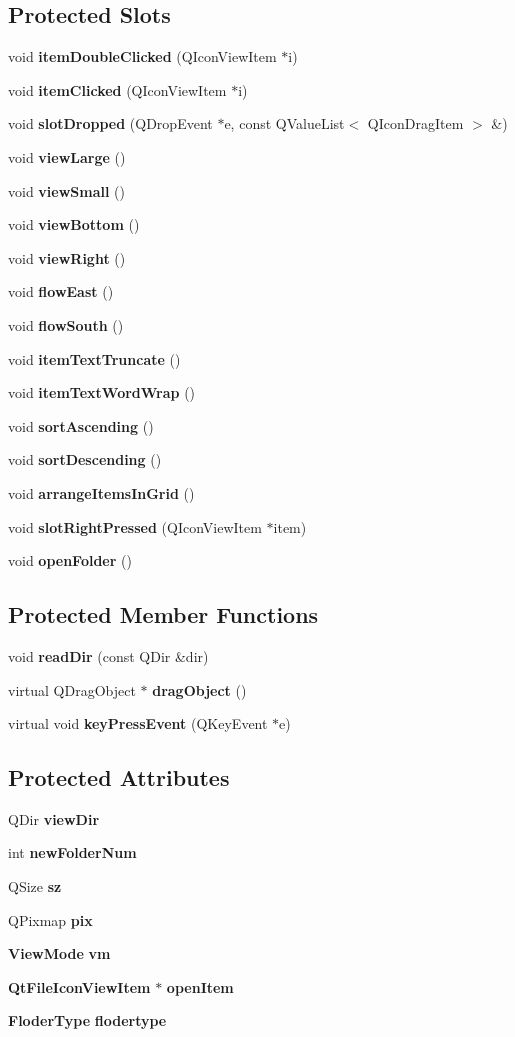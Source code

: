 \subsection*{Protected Slots}
\begin{CompactItemize}
\item 
void {\bf item\-Double\-Clicked} (QIcon\-View\-Item $\ast$i)
\item 
void {\bf item\-Clicked} (QIcon\-View\-Item $\ast$i)
\item 
void {\bf slot\-Dropped} (QDrop\-Event $\ast$e, const QValue\-List$<$ QIcon\-Drag\-Item $>$ \&)
\item 
void {\bf view\-Large} ()
\item 
void {\bf view\-Small} ()
\item 
void {\bf view\-Bottom} ()
\item 
void {\bf view\-Right} ()
\item 
void {\bf flow\-East} ()
\item 
void {\bf flow\-South} ()
\item 
void {\bf item\-Text\-Truncate} ()
\item 
void {\bf item\-Text\-Word\-Wrap} ()
\item 
void {\bf sort\-Ascending} ()
\item 
void {\bf sort\-Descending} ()
\item 
void {\bf arrange\-Items\-In\-Grid} ()
\item 
void {\bf slot\-Right\-Pressed} (QIcon\-View\-Item $\ast$item)
\item 
void {\bf open\-Folder} ()
\end{CompactItemize}
\subsection*{Protected Member Functions}
\begin{CompactItemize}
\item 
void {\bf read\-Dir} (const QDir \&dir)
\item 
virtual QDrag\-Object $\ast$ {\bf drag\-Object} ()
\item 
virtual void {\bf key\-Press\-Event} (QKey\-Event $\ast$e)
\end{CompactItemize}
\subsection*{Protected Attributes}
\begin{CompactItemize}
\item 
QDir {\bf view\-Dir}
\item 
int {\bf new\-Folder\-Num}
\item 
QSize {\bf sz}
\item 
QPixmap {\bf pix}
\item 
{\bf View\-Mode} {\bf vm}
\item 
{\bf Qt\-File\-Icon\-View\-Item} $\ast$ {\bf open\-Item}
\item 
{\bf Floder\-Type} {\bf flodertype}
\end{CompactItemize}


